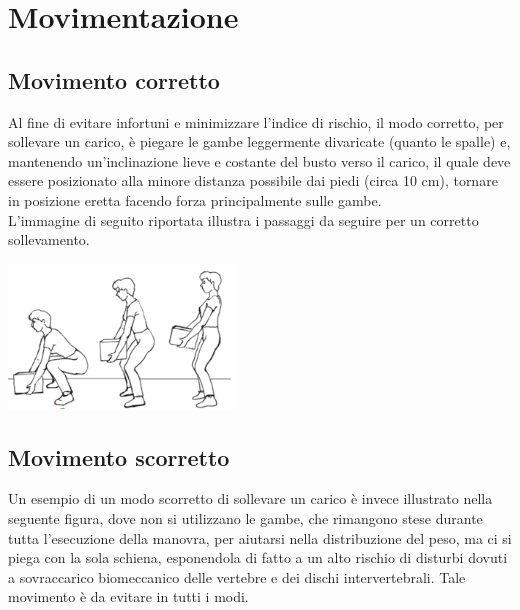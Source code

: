 \documentclass[a4paper]{article}
\begin{document}
	\clearpage

	\section{Movimentazione}

	\subsection{Movimento corretto}
Al fine di evitare infortuni e minimizzare l'indice di rischio, il modo corretto, per sollevare un carico, è piegare le gambe leggermente divaricate (quanto le spalle) e, mantenendo un’inclinazione lieve e costante del busto verso il carico, il quale deve essere posizionato alla minore distanza possibile dai piedi (circa 10 cm), tornare in posizione eretta facendo forza principalmente sulle gambe. \\ L'immagine di seguito riportata illustra i passaggi da seguire per un corretto sollevamento.\\

\makebox[\linewidth]{}
\begin{center}
\begin{minipage}{0.48\linewidth}
\includegraphics[width=60mm,scale=0.7]{./images/sollevamento_corretto.png} 
\makebox[\linewidth]{}
\end{minipage}
\end{center}
\makebox[\linewidth]{}
\makebox[\linewidth]{}

\subsection{Movimento scorretto}
Un esempio di un modo scorretto di sollevare un carico è invece illustrato nella seguente figura, dove non si utilizzano le gambe, che rimangono stese durante tutta l'esecuzione della manovra, per aiutarsi nella distribuzione del peso, ma ci si piega con la sola schiena, esponendola di fatto a un alto rischio di disturbi dovuti a sovraccarico biomeccanico delle vertebre e dei dischi intervertebrali. Tale movimento è da evitare in tutti i modi. \\
\end{document}
